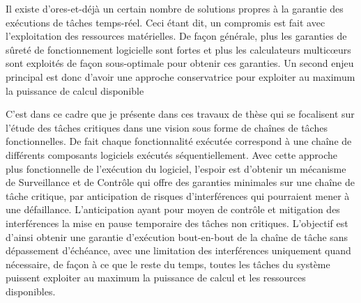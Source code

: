 \documentclass[french, a4paper, 11pt, twoside, pdftex]{StyleThese}
\begin{document}
Il existe d'ores-et-déjà un certain nombre de solutions propres à la garantie des exécutions de tâches temps-réel. Ceci étant dit, un compromis est fait avec l'exploitation des ressources matérielles. De façon générale, plus les garanties de sûreté de fonctionnement logicielle sont fortes et plus les calculateurs multicœurs sont exploités de façon sous-optimale pour obtenir ces garanties. Un second enjeu principal est donc d'avoir une approche conservatrice pour exploiter au maximum la puissance de calcul disponible

C'est dans ce cadre que je présente dans ces travaux de thèse qui se focalisent sur l'étude des tâches critiques dans une vision sous forme de chaînes de tâches fonctionnelles. De fait chaque fonctionnalité exécutée correspond à une chaîne de différents composants logiciels exécutés séquentiellement. Avec cette approche plus fonctionnelle de l'exécution du logiciel, l'espoir est d'obtenir un mécanisme de Surveillance et de Contrôle qui offre des garanties minimales sur une chaîne de tâche critique, par anticipation de risques d'interférences qui pourraient mener à une défaillance. L'anticipation ayant pour moyen de contrôle et mitigation des interférences la mise en pause temporaire des tâches non critiques. L'objectif est d'ainsi obtenir une garantie d'exécution bout-en-bout de la chaîne de tâche sans dépassement d'échéance, avec une limitation des interférences uniquement quand nécessaire, de façon à ce que le reste du temps, toutes les tâches du système puissent exploiter au maximum la puissance de calcul et les ressources disponibles. 
\end{document}
